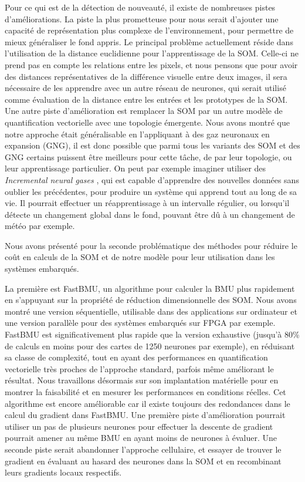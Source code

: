Pour ce qui est de la détection de nouveauté, il existe de nombreuses pistes d'améliorations. La piste la plus prometteuse pour nous serait d'ajouter une capacité de représentation plus complexe de l'environnement, pour permettre de mieux généraliser le fond appris. Le principal problème actuellement réside dans l'utilisation de la distance euclidienne pour l'apprentissage de la SOM. Celle-ci ne prend pas en compte les relations entre les pixels, et nous pensons que pour avoir des distances représentatives de la différence visuelle entre deux images, il sera nécessaire de les apprendre avec un autre réseau de neurones, qui serait utilisé comme évaluation de la distance entre les entrées et les prototypes de la SOM. Une autre piste d'amélioration est remplacer la SOM par un autre modèle de quantification vectorielle avec une topologie émergente. Nous avons montré que notre approche était généralisable en l'appliquant à des gaz neuronaux en expansion (GNG), il est donc possible que parmi tous les variants des SOM et des GNG certains puissent être meilleurs pour cette tâche, de par leur topologie, ou leur apprentissage particulier. On peut par exemple imaginer utiliser des \textit{Incremental neural gases} \cite{prudent2005incremental}, qui est capable d'apprendre des nouvelles données sans oublier les précédentes, pour produire un système qui apprend tout au long de sa vie. Il pourrait effectuer un réapprentissage à un intervalle régulier, ou lorsqu'il détecte un changement global dans le fond, pouvant être dû à un changement de météo par exemple.

Nous avons présenté pour la seconde problématique des méthodes pour réduire le coût en calculs de la SOM et de notre modèle pour leur utilisation dans les systèmes embarqués. 

La première est FastBMU, un algorithme pour calculer la BMU plus rapidement en s’appuyant sur la propriété de réduction dimensionnelle des SOM. Nous avons montré une version séquentielle, utilisable dans des applications sur ordinateur et une version parallèle pour des systèmes embarqués sur FPGA par exemple. FastBMU est significativement plus rapide que la version exhaustive (jusqu'à 80\% de calculs en moins pour des cartes de 1250 neurones par exemple), en réduisant sa classe de complexité, tout en ayant des performances en quantification vectorielle très proches de l’approche standard, parfois même améliorant le résultat. Nous travaillons désormais sur son implantation matérielle pour en montrer la faisabilité et en mesurer les performances en conditions réelles. Cet algorithme est encore améliorable car il existe toujours des redondances dans le calcul du gradient dans FastBMU. Une première piste d'amélioration pourrait utiliser un pas de plusieurs neurones pour effectuer la descente de gradient pourrait amener au même BMU en ayant moins de neurones à évaluer. Une seconde piste serait abandonner l'approche cellulaire, et essayer de trouver le gradient en évaluant au hasard des neurones dans la SOM et en recombinant leurs gradients locaux respectifs.

